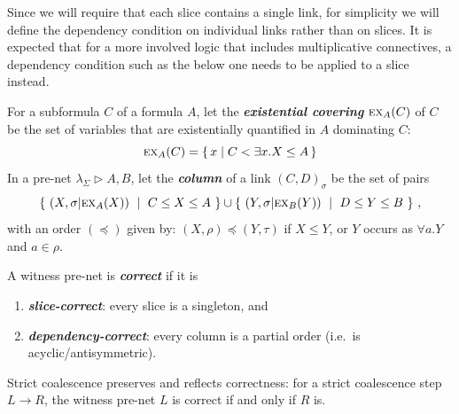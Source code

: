 \documentclass[UKenglish]{lipics-v2016}
\theoremstyle{plain}
\newcommand\defn[1]{\textit{\textbf{#1}}}
\newcommand\ex[2]{\textsc{ex}_{#1}(#2)}
\newcommand\+{+}
\renewcommand\*{\times}
\newcommand\sub{\leq}
\newcommand\dep{\preccurlyeq}
\newcommand\net[3]{#1\triangleright #2,#3}
\newcommand\link[3][\sigma]{(#2,#3)_{#1}}
\newcommand\scoal{\rightarrow} %
\begin{document}
Since we will require that each slice contains a single link, for simplicity we will define the dependency condition on individual links rather than on slices. It is expected that for a more involved logic that includes multiplicative connectives, a dependency condition such as the below one needs to be applied to a slice instead.

For a subformula $C$ of a formula $A$, let the \defn{existential covering} $\ex AC$ of $C$ be the set of variables that are existentially quantified in $A$ dominating $C$:
\[
	\ex AC = \{\,x \mid C < \exists x.X \sub A\,\}
\]
In a pre-net $\net{\lambda_\Sigma}AB$, let the \defn{column} of a link $\link CD$ be the set of pairs 
\[
	\{~(X,\sigma|\ex AX)~\mid~C\sub X\sub A~\}\cup\{~(Y,\sigma|\ex BY)~\mid~D\sub Y\sub B~\}~,
\]
with an order $(\dep)$ given by: $(X,\rho)\dep(Y,\tau)$ if $X\leq Y$, or $Y$ occurs as $\forall a.Y$ and $a\in\rho$.

\begin{definition}
A witness pre-net is \defn{correct} if it is
\begin{enumerate}
\item \defn{slice-correct}: every slice is a singleton, and
\item \defn{dependency-correct}: every column is a partial order (i.e.\ is acyclic/antisymmetric).
\end{enumerate}
\end{definition}


\begin{lemma}
\label{lem:preservation}
Strict coalescence preserves and reflects correctness: for a strict coalescence step $L\scoal R$, the witness pre-net $L$ is correct if and only if $R$ is.
\end{lemma}
\end{document}

